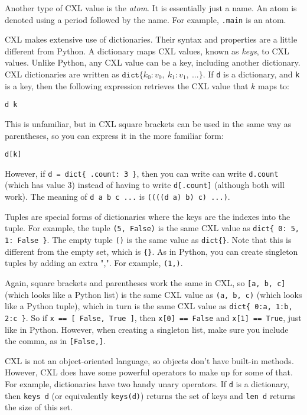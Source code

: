 \documentclass{report}
\newenvironment{code}{
\tcolorbox
}{
\endtcolorbox
}
\begin{document}
Another type of CXL value is the \emph{atom}.  It is essentially
just a name.  An atom is denoted using a period followed by the
name.  For example, \texttt{.main} is an atom.

CXL makes extensive use of dictionaries.  Their syntax and properties
are a little different from Python.
A dictionary maps CXL values, known as \emph{keys}, to CXL values.
Unlike Python, any CXL value can be a key, including another
dictionary.
CXL dictionaries are written as
$\mathtt{dict}\{ k_0: v_0, ~ k_1: v_1, ~ ... \}$.
If \texttt{d} is a dictionary, and \texttt{k} is a key, then the
following expression retrieves the CXL value that $k$ maps to:
\begin{code}
\begin{verbatim}
d k
\end{verbatim}
\end{code}
This is unfamiliar, but in CXL square brackets can be used in the
same way as parentheses, so you can express it in the more familiar
form:
\begin{code}
\begin{verbatim}
d[k]
\end{verbatim}
\end{code}
However, if \texttt{d = dict\{ .count: 3 \}}, then you can write
can write \texttt{d.count} (which has value 3) instead of having to write
\texttt{d[.count]} (although both will work).
The meaning of \texttt{d a b c ...} is \texttt{((((d a) b) c) ...)}.

Tuples are special forms of dictionaries where the keys are
the indexes into the tuple.  For example, the tuple
\texttt{(5, False)} is the same CXL value as
\texttt{dict\{ 0: 5, 1: False \}}.
The empty tuple \texttt{()} is the same value as \texttt{dict\{\}}.
Note that this is different from the empty set, which is \texttt{\{\}}.
As in Python, you can create singleton tuples by adding an
extra ",". For example, \texttt{(1,)}.

Again, square brackets and parentheses work the same in CXL, so
\texttt{[a, b, c]} (which looks like a Python list)
is the same CXL value as \texttt{(a, b, c)} (which looks like a Python tuple),
which in turn is the same CXL value as \texttt{dict\{ 0:a, 1:b, 2:c \}}.
So if \texttt{x == [ False, True ]},
then \texttt{x[0] == False} and \texttt{x[1] == True}, just like in Python.
However, when creating a singleton list, make sure you include the
comma, as in \texttt{[False,]}.

CXL is not an object-oriented language, so objects don't have
built-in methods.  However, CXL does have some powerful operators to
make up for some of that.
For example, dictionaries have two handy unary operators.
If \texttt{d} is a
dictionary, then \texttt{keys~d} (or equivalently \texttt{keys(d)})
returns the set of keys and \texttt{len~d} returns the size of
this set.
\end{document}
